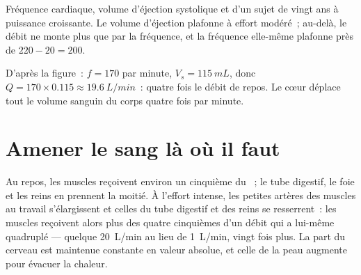 \begin{omfigure}

{\small Fréquence cardiaque, volume d'éjection systolique et  d'un sujet de vingt ans à puissance croissante. Le volume
d'éjection plafonne à effort modéré~; au-delà, le débit ne monte plus
que par la fréquence, et la fréquence elle-même plafonne près de
$220 - 20 = 200$.}
\end{omfigure}

\begin{example}\label{ex:g10:heart-lungs-effort:output200}
D'après la figure~: $f = 170$ par minute, $V_s = \qty{115}{mL}$, donc
$Q = 170 \times 0.115 \approx \qty{19.6}{L/min}$~: quatre fois le débit
de repos. Le cœur déplace tout le volume sanguin du corps quatre fois
par minute.
\end{example}

\section{Amener le sang là où il faut}

\begin{proposition}\label{prop:g10:heart-lungs-effort:redistribution}
Au repos, les muscles reçoivent environ un cinquième du ~; le tube digestif, le foie et les reins en prennent la
moitié. À l'effort intense, les petites artères des muscles au travail
s'élargissent et celles du tube digestif et des reins se resserrent~:
les muscles reçoivent alors plus des quatre cinquièmes d'un débit qui a
lui-même quadruplé --- quelque \qty{20}{L/min} au lieu de
\qty{1}{L/min}, vingt fois plus. La part du cerveau est maintenue
constante en valeur absolue, et celle de la peau augmente pour évacuer
la chaleur.
\end{proposition}
\admitted

